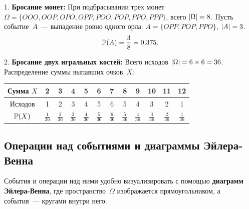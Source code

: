 \begin{example}
1. \textbf{Бросание монет:} При подбрасывании трех монет $\Omega = \{OOO, OOP, OPO, OPP, POO, POP, PPO, PPP\}$, всего $\lvert\Omega\rvert = 8$. Пусть событие~$A$~--- выпадение ровно одного орла: $A = \{OPP, POP, PPO\}$, $\lvert A\rvert = 3$.
\[
\mathbb{P}(A) = \frac{3}{8} = 0{,}375.
\]

2. \textbf{Бросание двух игральных костей:} Всего исходов $\lvert\Omega\rvert = 6 \times 6 = 36$. Распределение суммы выпавших очков~$X$:
\begin{center}
\begin{tabular}{c*{11}{c}}
\toprule
Сумма $X$ & 2 & 3 & 4 & 5 & 6 & 7 & 8 & 9 & 10 & 11 & 12 \\
\midrule
Исходов & 1 & 2 & 3 & 4 & 5 & 6 & 5 & 4 & 3 & 2 & 1 \\
$\mathbb{P}(X)$ & $\frac{1}{36}$ & $\frac{2}{36}$ & $\frac{3}{36}$ & $\frac{4}{36}$ & $\frac{5}{36}$ & $\frac{6}{36}$ & $\frac{5}{36}$ & $\frac{4}{36}$ & $\frac{3}{36}$ & $\frac{2}{36}$ & $\frac{1}{36}$ \\
\bottomrule
\end{tabular}
\end{center}
\end{example}

\subsection{Операции над событиями и диаграммы Эйлера-Венна}
События и операции над ними удобно визуализировать с помощью \textbf{диаграмм Эйлера-Венна}, где пространство~$\Omega$ изображается прямоугольником, а события~--- кругами внутри него.

